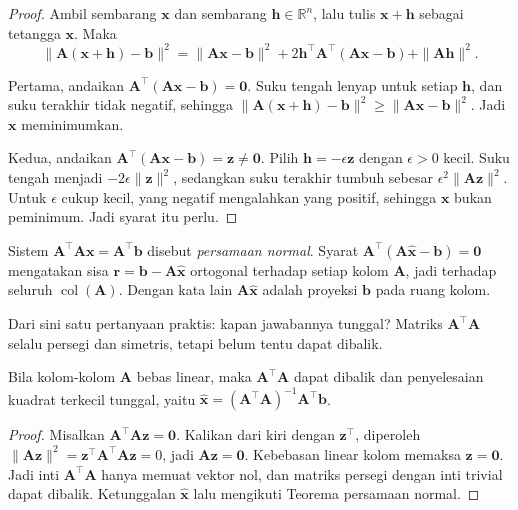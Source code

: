 \begin{proof}
Ambil sembarang $\mathbf{x}$ dan sembarang $\mathbf{h}\in\mathbb{R}^{n}$, lalu tulis
$\mathbf{x}+\mathbf{h}$ sebagai tetangga $\mathbf{x}$. Maka
\[
  \|\mathbf{A}(\mathbf{x}+\mathbf{h})-\mathbf{b}\|^{2}
  =\|\mathbf{A}\mathbf{x}-\mathbf{b}\|^{2}
   +2\mathbf{h}^{\top}\mathbf{A}^{\top}(\mathbf{A}\mathbf{x}-\mathbf{b})
   +\|\mathbf{A}\mathbf{h}\|^{2}.
\]

Pertama, andaikan $\mathbf{A}^{\top}(\mathbf{A}\mathbf{x}-\mathbf{b})=\mathbf{0}$.
Suku tengah lenyap untuk setiap $\mathbf{h}$, dan suku terakhir tidak negatif, sehingga
$\|\mathbf{A}(\mathbf{x}+\mathbf{h})-\mathbf{b}\|^{2}\ge\|\mathbf{A}\mathbf{x}-\mathbf{b}\|^{2}$.
Jadi $\mathbf{x}$ meminimumkan.

Kedua, andaikan $\mathbf{A}^{\top}(\mathbf{A}\mathbf{x}-\mathbf{b})=\mathbf{z}\ne\mathbf{0}$.
Pilih $\mathbf{h}=-\epsilon\mathbf{z}$ dengan $\epsilon>0$ kecil. Suku tengah menjadi
$-2\epsilon\|\mathbf{z}\|^{2}$, sedangkan suku terakhir tumbuh sebesar
$\epsilon^{2}\|\mathbf{A}\mathbf{z}\|^{2}$. Untuk $\epsilon$ cukup kecil, yang negatif
mengalahkan yang positif, sehingga $\mathbf{x}$ bukan peminimum. Jadi syarat itu perlu.
\end{proof}

Sistem $\mathbf{A}^{\top}\mathbf{A}\mathbf{x}=\mathbf{A}^{\top}\mathbf{b}$ disebut
\emph{persamaan normal}. Syarat
$\mathbf{A}^{\top}(\mathbf{A}\hat{\mathbf{x}}-\mathbf{b})=\mathbf{0}$ mengatakan sisa
$\mathbf{r}=\mathbf{b}-\mathbf{A}\hat{\mathbf{x}}$ ortogonal terhadap setiap kolom
$\mathbf{A}$, jadi terhadap seluruh $\operatorname{col}(\mathbf{A})$. Dengan kata lain
$\mathbf{A}\hat{\mathbf{x}}$ adalah proyeksi $\mathbf{b}$ pada ruang kolom.

Dari sini satu pertanyaan praktis: kapan jawabannya tunggal? Matriks
$\mathbf{A}^{\top}\mathbf{A}$ selalu persegi dan simetris, tetapi belum tentu dapat
dibalik.

\begin{akibat}
Bila kolom-kolom $\mathbf{A}$ bebas linear, maka $\mathbf{A}^{\top}\mathbf{A}$ dapat
dibalik dan penyelesaian kuadrat terkecil tunggal, yaitu
$\hat{\mathbf{x}}=(\mathbf{A}^{\top}\mathbf{A})^{-1}\mathbf{A}^{\top}\mathbf{b}$.
\end{akibat}

\begin{proof}
Misalkan $\mathbf{A}^{\top}\mathbf{A}\mathbf{z}=\mathbf{0}$. Kalikan dari kiri dengan
$\mathbf{z}^{\top}$, diperoleh $\|\mathbf{A}\mathbf{z}\|^{2}
=\mathbf{z}^{\top}\mathbf{A}^{\top}\mathbf{A}\mathbf{z}=0$, jadi
$\mathbf{A}\mathbf{z}=\mathbf{0}$. Kebebasan linear kolom memaksa $\mathbf{z}=\mathbf{0}$.
Jadi inti $\mathbf{A}^{\top}\mathbf{A}$ hanya memuat vektor nol, dan matriks persegi
dengan inti trivial dapat dibalik. Ketunggalan $\hat{\mathbf{x}}$ lalu mengikuti
Teorema persamaan normal.
\end{proof}


